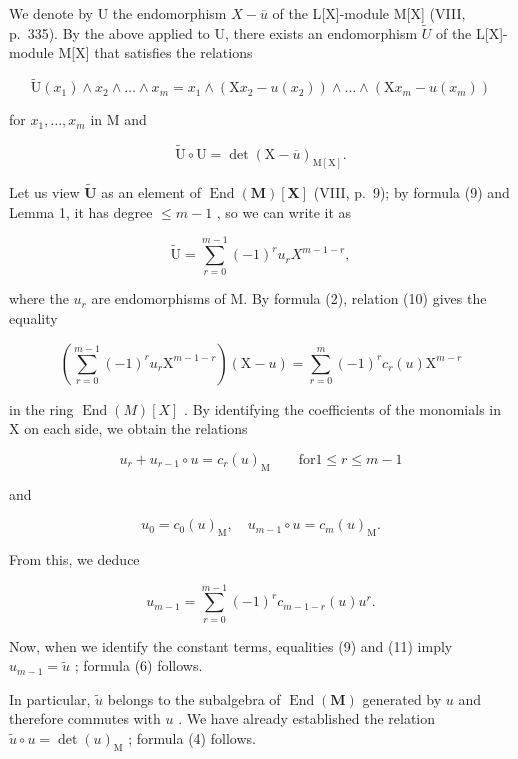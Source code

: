 We denote by U the endomorphism \(X - \overline{u}\) of the L{[}X{]}-module M{[}X{]} (VIII, p.~335). By the above applied to U, there exists an endomorphism \(\widetilde{U}\) of the L{[}X{]}-module M{[}X{]} that satisfies the relations

\[
\widetilde {\mathrm{U}} (x _ {1}) \wedge x _ {2} \wedge \dots \wedge x _ {m} = x _ {1} \wedge (\mathrm{X} x _ {2} - u (x _ {2})) \wedge \dots \wedge (\mathrm{X} x _ {m} - u (x _ {m}))\tag{9}
\]

for \(x_{1},\ldots ,x_{m}\) in M and

\[
\widetilde {\mathrm{U}} \circ \mathrm{U} = \det (\mathrm{X} - \overline {{u}}) _ {\mathrm{M} [ \mathrm{X} ]}.\tag{10}
\]

Let us view \(\widetilde{\mathbf{U}}\) as an element of \(\operatorname{End}(\mathbf{M})[\mathbf{X}]\) (VIII, p.~9); by formula (9) and Lemma 1, it has degree \(\leqslant m - 1\) , so we can write it as

\[
\widetilde {\mathrm{U}} = \sum_ {r = 0} ^ {m - 1} (- 1) ^ {r} u _ {r} X ^ {m - 1 - r},\tag{11}
\]

where the \(u_{r}\) are endomorphisms of M. By formula (2), relation (10) gives the equality

\[
\left(\sum_ {r = 0} ^ {m - 1} (- 1) ^ {r} u _ {r} \mathrm{X} ^ {m - 1 - r}\right) (\mathrm{X} - u) = \sum_ {r = 0} ^ {m} (- 1) ^ {r} c _ {r} (u) \mathrm{X} ^ {m - r}\tag{12}
\]

in the ring \(\operatorname{End}(M)[X]\) . By identifying the coefficients of the monomials in X on each side, we obtain the relations

\[
u _ {r} + u _ {r - 1} \circ u = c _ {r} (u) _ {\mathrm{M}} \qquad \mathrm{for} 1 \leqslant r \leqslant m - 1\tag{13}
\]

and

\[
u _ {0} = c _ {0} (u) _ {\mathrm{M}}, \quad u _ {m - 1} \circ u = c _ {m} (u) _ {\mathrm{M}}.\tag{14}
\]

From this, we deduce

\[
u _ {m - 1} = \sum_ {r = 0} ^ {m - 1} (- 1) ^ {r} c _ {m - 1 - r} (u) u ^ {r}.\tag{15}
\]

Now, when we identify the constant terms, equalities (9) and (11) imply \(u_{m-1} = \widetilde{u}\) ; formula (6) follows.

In particular, \(\widetilde{u}\) belongs to the subalgebra of \(\operatorname{End}(\mathbf{M})\) generated by \(u\) and therefore commutes with \(u\) . We have already established the relation \(\widetilde{u} \circ u = \det(u)_{\mathrm{M}}\) ; formula (4) follows.

